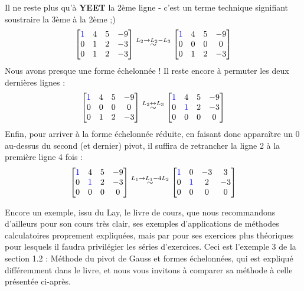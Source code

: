 \documentclass{article}
\begin{document}
Il ne reste plus qu'à \textbf{YEET} la 2ème ligne - c'est un terme technique signifiant soustraire la 3ème à la 2ème ;)
$$
\begin{bmatrix}
\color{blue}1  &  4 &  5 & -9\\
0 & 1 & 2 & -3 \\
0 & 1 & 2 & -3 
\end{bmatrix}
\overset{L_2 \to L_2 - L_3}{\sim}
\begin{bmatrix}
\color{blue}1  &  4 &  5 & -9\\
0 & 0 & 0 & 0 \\
0 & 1 & 2 & -3 
\end{bmatrix}
$$
Nous avons presque une forme échelonnée ! Il reste encore à permuter les deux dernières lignes :
$$
\begin{bmatrix}
\color{blue}1  &  4 &  5 & -9\\
0 & 0 & 0 & 0 \\
0 & 1 & 2 & -3 
\end{bmatrix}
\overset{L_2 \leftrightarrow L_3}{\sim}
\begin{bmatrix}
\color{blue}1  &  4 &  5 & -9\\
0 & \color{blue}1 & 2 & -3 \\
0 & 0 & 0 & 0
\end{bmatrix}
$$
Enfin, pour arriver à la forme échelonnée réduite, en faisant donc apparaître un 0 au-dessus du second (et dernier) pivot, il suffira de retrancher la ligne 2 à la première ligne 4 fois :
$$
\begin{bmatrix}
\color{blue}1  &  4 &  5 & -9\\
0 & \color{blue}1 & 2 & -3 \\
0 & 0 & 0 & 0
\end{bmatrix}
\overset{L_1 \to L_1 - 4L_2}{\sim}
\begin{bmatrix}
\color{blue}1  &  0 &  -3 & 3\\
0 & \color{blue}1 & 2 & -3 \\
0 & 0 & 0 & 0
\end{bmatrix}
$$

\noindent Encore un exemple, issu du Lay, le livre de cours, que nous recommandons d'ailleurs pour son cours très clair, ses exemples d'applications de méthodes calculatoires proprement expliquées, mais par pour ses exercices plus théoriques pour lesquels il faudra privilégier les séries d'exercices. Ceci est l'exemple 3 de la section 1.2 : Méthode du pivot de Gauss et formes échelonnées, qui est expliqué différemment dans le livre, et nous vous invitons à comparer sa méthode à celle présentée ci-après. \\
\end{document}
